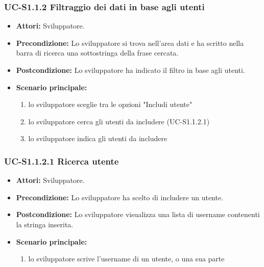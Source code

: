 	\subsubsection{UC-S1.1.2 Filtraggio dei dati in base agli utenti}	
		\begin{itemize}
			\item \textbf{Attori:} Sviluppatore.
			\item \textbf{Precondizione:} Lo sviluppatore si trova nell'area dati e ha scritto nella barra di ricerca una sottostringa della frase cercata.
			\item \textbf{Postcondizione:} Lo sviluppatore ha indicato il filtro in base agli utenti.
			\item \textbf{Scenario principale:}
				\begin{enumerate}
					\item lo sviluppatore sceglie tra le opzioni "Includi utente"
					\item lo sviluppatore cerca gli utenti da includere (UC-S1.1.2.1)
					\item lo sviluppatore indica gli utenti da includere
				\end{enumerate}
		\end{itemize}
		
	\subsubsection{UC-S1.1.2.1 Ricerca utente}
		\begin{itemize}
			\item \textbf{Attori:} Sviluppatore.
			\item \textbf{Precondizione:} Lo sviluppatore ha scelto di includere un utente.
			\item \textbf{Postcondizione:} Lo sviluppatore visualizza una lista di username contenenti la stringa inserita.
			\item \textbf{Scenario principale:}
			\begin{enumerate}
				\item lo sviluppatore scrive l'username di un utente, o una sua parte
			\end{enumerate}
		\end{itemize}		
			
